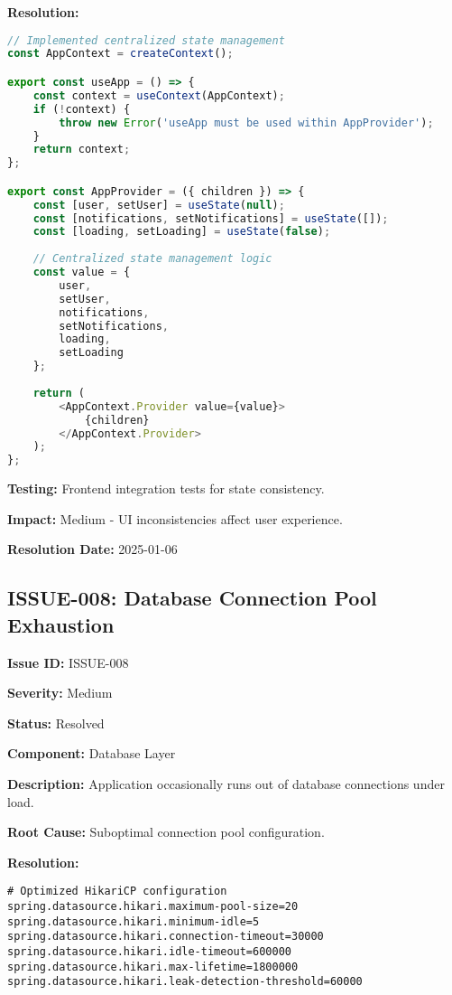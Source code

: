 \documentclass[12pt,a4paper]{article}
\begin{document}
\textbf{Resolution:}
\begin{lstlisting}[language=JavaScript, caption=Centralized State Management]
// Implemented centralized state management
const AppContext = createContext();

export const useApp = () => {
    const context = useContext(AppContext);
    if (!context) {
        throw new Error('useApp must be used within AppProvider');
    }
    return context;
};

export const AppProvider = ({ children }) => {
    const [user, setUser] = useState(null);
    const [notifications, setNotifications] = useState([]);
    const [loading, setLoading] = useState(false);
    
    // Centralized state management logic
    const value = {
        user,
        setUser,
        notifications,
        setNotifications,
        loading,
        setLoading
    };
    
    return (
        <AppContext.Provider value={value}>
            {children}
        </AppContext.Provider>
    );
};
\end{lstlisting}

\textbf{Testing:} Frontend integration tests for state consistency.

\textbf{Impact:} Medium - UI inconsistencies affect user experience.

\textbf{Resolution Date:} 2025-01-06

\subsection{ISSUE-008: Database Connection Pool Exhaustion}

\textbf{Issue ID:} ISSUE-008

\textbf{Severity:} Medium

\textbf{Status:} Resolved

\textbf{Component:} Database Layer

\textbf{Description:} Application occasionally runs out of database connections under load.

\textbf{Root Cause:} Suboptimal connection pool configuration.

\textbf{Resolution:}
\begin{lstlisting}[language=properties, caption=Optimized Connection Pool Configuration]
# Optimized HikariCP configuration
spring.datasource.hikari.maximum-pool-size=20
spring.datasource.hikari.minimum-idle=5
spring.datasource.hikari.connection-timeout=30000
spring.datasource.hikari.idle-timeout=600000
spring.datasource.hikari.max-lifetime=1800000
spring.datasource.hikari.leak-detection-threshold=60000
\end{lstlisting}
\end{document}
